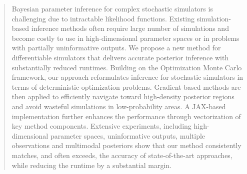 \documentclass[twoside]{article}
\begin{document}


%


\begin{abstract}
Bayesian parameter inference for complex stochastic simulators is challenging due to intractable likelihood functions.
%
Existing simulation-based inference methods often require large number of simulations and become costly to use in high-dimensional parameter spaces or in problems with partially uninformative outputs.
%
We propose a new method for differentiable simulators that delivers accurate posterior inference with substantially reduced runtimes.
%
Building on the Optimization Monte Carlo framework, our approach reformulates inference for stochastic simulators in terms of deterministic optimization problems.
%
Gradient-based methods are then applied to efficiently navigate toward high-density posterior regions and avoid wasteful simulations in low-probability areas.
%
A JAX-based implementation further enhances the performance through vectorization of key method components.
%
Extensive experiments, including high-dimensional parameter spaces, uninformative outputs, multiple observations and multimodal posteriors show that our method consistently matches, and often exceeds, the accuracy of state-of-the-art approaches, while reducing the runtime by a substantial margin.
\end{abstract}
\end{document}
